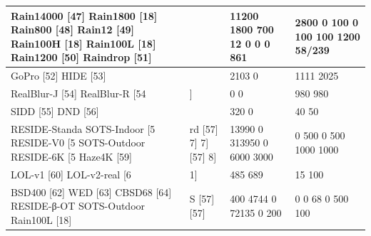 \begin{tabular}{llll}
\toprule
Rain14000 [47] Rain1800 [18] Rain800 [48] Rain12 [49] Rain100H [18] Rain100L [18] Rain1200 [50] Raindrop [51] &  & 11200 1800 700 12 0 0 0 861 & 2800 0 100 0 100 100 1200 58/239 \\
\midrule
GoPro [52] HIDE [53] &  & 2103 0 & 1111 2025 \\
RealBlur-J [54] RealBlur-R [54 & ] & 0 0 & 980 980 \\
SIDD [55] DND [56] &  & 320 0 & 40 50 \\
RESIDE-Standa SOTS-Indoor [5 RESIDE-V0 [5 SOTS-Outdoor RESIDE-6K [5 Haze4K [59] & rd [57] 7] 7] [57] 8] & 13990 0 313950 0 6000 3000 & 0 500 0 500 1000 1000 \\
LOL-v1 [60] LOL-v2-real [6 & 1] & 485 689 & 15 100 \\
BSD400 [62] WED [63] CBSD68 [64] RESIDE-β-OT SOTS-Outdoor Rain100L [18] & S [57] [57] & 400 4744 0 72135 0 200 & 0 0 68 0 500 100 \\
\bottomrule
\end{tabular}
